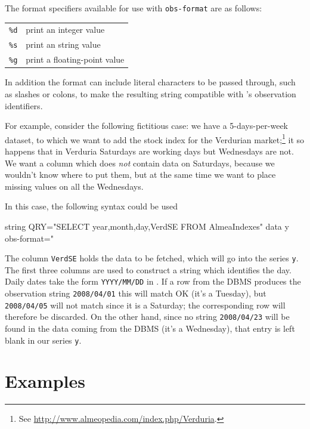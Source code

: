 The format specifiers available for use with \texttt{obs-format} are
as follows:

\begin{center}
\begin{tabular}{ll}
\texttt{\%d} & print an integer value \\
\texttt{\%s} & print an string value \\
\texttt{\%g} & print a floating-point value \\
\end{tabular}
\end{center}

In addition the format can include literal characters to be passed
through, such as slashes or colons, to make the resulting string
compatible with 's observation identifiers.

For example, consider the following fictitious case: we have a
5-days-per-week dataset, to which we want to add the stock index for
the Verdurian market;\footnote{See
  \url{http://www.almeopedia.com/index.php/Verduria}.} it so
happens that in Verduria Saturdays are working days but Wednesdays are
not. We want a column which does \emph{not} contain data on
Saturdays, because we wouldn't know where to put them, but at the same
time we want to place missing values on all the Wednesdays.

In this case, the following syntax could be used
%
\begin{code}
  string QRY="SELECT year,month,day,VerdSE FROM AlmeaIndexes"
  data y obs-format="%
\end{code}
%
The column \texttt{VerdSE} holds the data to be fetched, which will go
into the  series \texttt{y}. The first three columns are
used to construct a string which identifies the day. Daily dates take
the form \texttt{YYYY/MM/DD} in .  If a row from the DBMS
produces the observation string \texttt{2008/04/01} this will match OK
(it's a Tuesday), but \texttt{2008/04/05} will not match since it is a
Saturday; the corresponding row will therefore be discarded.  On the
other hand, since no string \texttt{2008/04/23} will be found in the
data coming from the DBMS (it's a Wednesday), that entry is left blank
in our series \texttt{y}.

\section{Examples}
\label{sec:examples}

